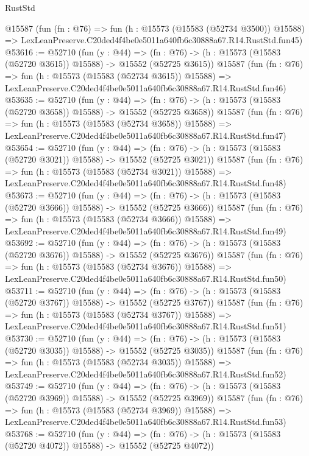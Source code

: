 \begin{lexlean}{RustStd}
\begin{coremodule}
    @15587
    (fun (fn : @76) =>
    fun (h : @15573 (@15583 (@52734 @3500)) @15588) =>
    LexLeanPreserve.C20ded4f4be0e5011a640fb6c30888a67.R14.RustStd.fun45)
@53616 := @52710
    (fun (y : @44) =>
    (fn : @76) -> (h : @15573 (@15583 (@52720 @3615)) @15588) -> @15552 (@52725 @3615))
    @15587
    (fun (fn : @76) =>
    fun (h : @15573 (@15583 (@52734 @3615)) @15588) =>
    LexLeanPreserve.C20ded4f4be0e5011a640fb6c30888a67.R14.RustStd.fun46)
@53635 := @52710
    (fun (y : @44) =>
    (fn : @76) -> (h : @15573 (@15583 (@52720 @3658)) @15588) -> @15552 (@52725 @3658))
    @15587
    (fun (fn : @76) =>
    fun (h : @15573 (@15583 (@52734 @3658)) @15588) =>
    LexLeanPreserve.C20ded4f4be0e5011a640fb6c30888a67.R14.RustStd.fun47)
@53654 := @52710
    (fun (y : @44) =>
    (fn : @76) -> (h : @15573 (@15583 (@52720 @3021)) @15588) -> @15552 (@52725 @3021))
    @15587
    (fun (fn : @76) =>
    fun (h : @15573 (@15583 (@52734 @3021)) @15588) =>
    LexLeanPreserve.C20ded4f4be0e5011a640fb6c30888a67.R14.RustStd.fun48)
@53673 := @52710
    (fun (y : @44) =>
    (fn : @76) -> (h : @15573 (@15583 (@52720 @3666)) @15588) -> @15552 (@52725 @3666))
    @15587
    (fun (fn : @76) =>
    fun (h : @15573 (@15583 (@52734 @3666)) @15588) =>
    LexLeanPreserve.C20ded4f4be0e5011a640fb6c30888a67.R14.RustStd.fun49)
@53692 := @52710
    (fun (y : @44) =>
    (fn : @76) -> (h : @15573 (@15583 (@52720 @3676)) @15588) -> @15552 (@52725 @3676))
    @15587
    (fun (fn : @76) =>
    fun (h : @15573 (@15583 (@52734 @3676)) @15588) =>
    LexLeanPreserve.C20ded4f4be0e5011a640fb6c30888a67.R14.RustStd.fun50)
@53711 := @52710
    (fun (y : @44) =>
    (fn : @76) -> (h : @15573 (@15583 (@52720 @3767)) @15588) -> @15552 (@52725 @3767))
    @15587
    (fun (fn : @76) =>
    fun (h : @15573 (@15583 (@52734 @3767)) @15588) =>
    LexLeanPreserve.C20ded4f4be0e5011a640fb6c30888a67.R14.RustStd.fun51)
@53730 := @52710
    (fun (y : @44) =>
    (fn : @76) -> (h : @15573 (@15583 (@52720 @3035)) @15588) -> @15552 (@52725 @3035))
    @15587
    (fun (fn : @76) =>
    fun (h : @15573 (@15583 (@52734 @3035)) @15588) =>
    LexLeanPreserve.C20ded4f4be0e5011a640fb6c30888a67.R14.RustStd.fun52)
@53749 := @52710
    (fun (y : @44) =>
    (fn : @76) -> (h : @15573 (@15583 (@52720 @3969)) @15588) -> @15552 (@52725 @3969))
    @15587
    (fun (fn : @76) =>
    fun (h : @15573 (@15583 (@52734 @3969)) @15588) =>
    LexLeanPreserve.C20ded4f4be0e5011a640fb6c30888a67.R14.RustStd.fun53)
@53768 := @52710
    (fun (y : @44) =>
    (fn : @76) -> (h : @15573 (@15583 (@52720 @4072)) @15588) -> @15552 (@52725 @4072))

\end{coremodule}
\end{lexlean}
